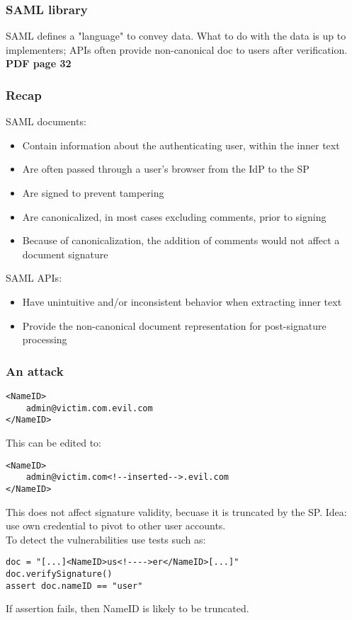 \documentclass[a4paper, 10pt, titlepage]{article}
\begin{document}
\subsubsection{SAML library}
SAML defines a "language" to convey data. What to do with the data is up to implementers; APIs often provide non-canonical doc to users after verification. \medskip \\
\textbf{PDF page 32}

\subsubsection{Recap}
SAML documents:
\begin{itemize}
\item Contain information about the authenticating user, within the inner text
\item Are often passed through a user’s browser from the IdP to the SP
\item Are signed to prevent tampering
\item Are canonicalized, in most cases excluding comments, prior to signing
\item Because of canonicalization, the addition of comments would not affect a document signature
\end{itemize}
SAML APIs:
\begin{itemize}
\item Have unintuitive and/or inconsistent behavior when extracting inner text
\item Provide the non-canonical document representation for post-signature processing
\end{itemize}

\subsubsection{An attack}
\begin{lstlisting}
<NameID>
	admin@victim.com.evil.com
</NameID>
\end{lstlisting}
This can be edited to:
\begin{lstlisting}
<NameID>
	admin@victim.com<!--inserted-->.evil.com
</NameID>
\end{lstlisting}
This does not affect signature validity, becuase it is truncated by the SP. Idea: use own credential to pivot to other user accounts. \medskip\\
To detect the vulnerabilities use tests such as:
\begin{lstlisting}
doc = "[...]<NameID>us<!---->er</NameID>[...]"
doc.verifySignature()
assert doc.nameID == "user"
\end{lstlisting}
If assertion fails, then NameID is likely to be truncated. \medskip
\end{document}
